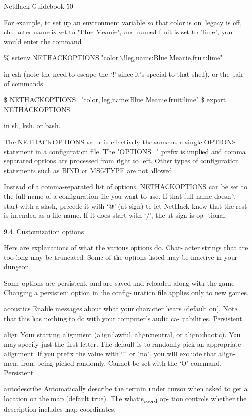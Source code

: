 \documentclass[11pt]{article}
\begin{document}
NetHack Guidebook                       50



   For example, to set up an environment variable so that color
is on, legacy is off, character name is set to "Blue Meanie", and
named fruit is set to "lime", you would enter the command

\% setenv NETHACKOPTIONS "color,$\backslash$!leg,name:Blue Meanie,fruit:lime"

in csh (note the need to escape the `!' since it's special to
that shell), or the pair of commands

\$ NETHACKOPTIONS="color,!leg,name:Blue Meanie,fruit:lime"
\$ export NETHACKOPTIONS

in sh, ksh, or bash.

   The NETHACKOPTIONS value is effectively the same as a single
OPTIONS statement in a configuration file. The "OPTIONS=" prefix
is implied and comma separated options are processed from right
to left. Other types of configuration statements such as BIND or
MSGTYPE are not allowed.

   Instead of a comma-separated list of options, NETHACKOPTIONS
can be set to the full name of a configuration file you want to
use. If that full name doesn't start with a slash, precede it
with `@' (at-sign) to let NetHack know that the rest is intended
as a file name. If it does start with `/', the at-sign is op-
tional.

9.4. Customization options

   Here are explanations of what the various options do. Char-
acter strings that are too long may be truncated.  Some of the
options listed may be inactive in your dungeon.

   Some options are persistent, and are saved and reloaded
along with the game. Changing a persistent option in the config-
uration file applies only to new games.

acoustics
 Enable messages about what your character hears (default on).
 Note that this has nothing to do with your computer's audio ca-
 pabilities. Persistent.

align
 Your  starting  alignment (align:lawful, align:neutral, or
 align:chaotic). You may specify just the first letter.  The
 default is to randomly pick an appropriate alignment. If you
 prefix the value with `!' or "no", you will exclude that align-
 ment from being picked randomly. Cannot be set with the `O'
 command. Persistent.

autodescribe
 Automatically describe the terrain under cursor when asked to
 get a location on the map (default true). The whatis\textsubscript{coord} op-
 tion controls whether the description includes map coordinates.
\end{document}
